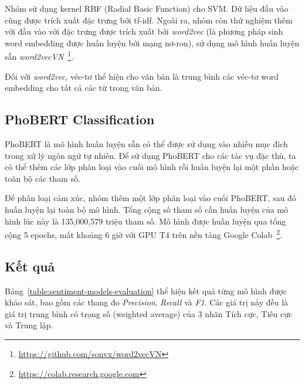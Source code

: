 Nhóm sử dụng kernel RBF (Radial Basic Function) cho SVM. Dữ liệu đầu vào cũng được trích xuất đặc trưng bởi \acrshort{tf-idf}. Ngoài ra, nhóm còn thử nghiệm thêm với đầu vào với đặc trưng được trích xuất bởi \textit{word2vec} (là phương pháp sinh word embedding được huấn luyện bởi mạng nơ-ron), sử dụng mô hình huấn luyện sẵn \textit{word2vecVN}~\footnote{\url{https://github.com/sonvx/word2vecVN}}.

Đối với \textit{word2vec}, véc-tơ thể hiện cho văn bản là trung bình các véc-tơ word embedding cho tất cả các từ trong văn bản.


\subsection{PhoBERT Classification}
PhoBERT là mô hình huấn luyện sẵn có thể được sử dụng vào nhiều mục đích trong xử lý ngôn ngữ tự nhiên. Để sử dụng PhoBERT cho các tác vụ đặc thù, ta có thể thêm các lớp phân loại vào cuối mô hình rồi huấn luyện lại một phần hoặc toàn bộ các tham số.

Để phân loại cảm xúc, nhóm thêm một lớp phân loại vào cuối PhoBERT, sau đó huấn luyện lại toàn bộ mô hình. Tổng cộng số tham số cần huấn luyện của mô hình lúc này là 135,000,579 triệu tham số. Mô hình được huấn luyện qua tổng cộng 5 epochs, mất khoảng 6 giờ với GPU T4 trên nền tảng Google Colab~\footnote{\url{https://colab.research.google.com}}.

\subsection{Kết quả}
Bảng~\ref{table:sentiment-models-evaluation} thể hiện kết quả từng mô hình được khảo sát, bao gồm các thang đo \textit{Precision}, \textit{Recall} và \textit{F1}. Các giá trị này đều là giá trị trung bình có trọng số (weighted average) của 3 nhãn Tích cực, Tiêu cực và Trung lập.

